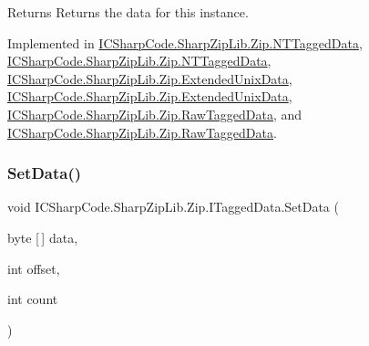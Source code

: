 \begin{DoxyReturn}{Returns}
Returns the data for this instance.
\end{DoxyReturn}


Implemented in \hyperlink{class_i_c_sharp_code_1_1_sharp_zip_lib_1_1_zip_1_1_n_t_tagged_data_adde7c262e6270ca2419f1d4a26a9701a}{I\+C\+Sharp\+Code.\+Sharp\+Zip\+Lib.\+Zip.\+N\+T\+Tagged\+Data}, \hyperlink{class_i_c_sharp_code_1_1_sharp_zip_lib_1_1_zip_1_1_n_t_tagged_data_adde7c262e6270ca2419f1d4a26a9701a}{I\+C\+Sharp\+Code.\+Sharp\+Zip\+Lib.\+Zip.\+N\+T\+Tagged\+Data}, \hyperlink{class_i_c_sharp_code_1_1_sharp_zip_lib_1_1_zip_1_1_extended_unix_data_affc68b6149e70affca3d7bcd41d9634b}{I\+C\+Sharp\+Code.\+Sharp\+Zip\+Lib.\+Zip.\+Extended\+Unix\+Data}, \hyperlink{class_i_c_sharp_code_1_1_sharp_zip_lib_1_1_zip_1_1_extended_unix_data_affc68b6149e70affca3d7bcd41d9634b}{I\+C\+Sharp\+Code.\+Sharp\+Zip\+Lib.\+Zip.\+Extended\+Unix\+Data}, \hyperlink{class_i_c_sharp_code_1_1_sharp_zip_lib_1_1_zip_1_1_raw_tagged_data_acd58d127e920dae4d94b2e396a6fc91c}{I\+C\+Sharp\+Code.\+Sharp\+Zip\+Lib.\+Zip.\+Raw\+Tagged\+Data}, and \hyperlink{class_i_c_sharp_code_1_1_sharp_zip_lib_1_1_zip_1_1_raw_tagged_data_acd58d127e920dae4d94b2e396a6fc91c}{I\+C\+Sharp\+Code.\+Sharp\+Zip\+Lib.\+Zip.\+Raw\+Tagged\+Data}.

\mbox{\label{interface_i_c_sharp_code_1_1_sharp_zip_lib_1_1_zip_1_1_i_tagged_data_a1d13a64f1fcc5caf769fe96d8fc8561a}} 
\subsubsection{\texorpdfstring{Set\+Data()}{SetData()}\hspace{0.1cm}{\footnotesize\ttfamily [1/2]}}
{\footnotesize\ttfamily void I\+C\+Sharp\+Code.\+Sharp\+Zip\+Lib.\+Zip.\+I\+Tagged\+Data.\+Set\+Data (\begin{DoxyParamCaption}\item[{byte \mbox{[}$\,$\mbox{]}}]{data,  }\item[{int}]{offset,  }\item[{int}]{count }\end{DoxyParamCaption})}



